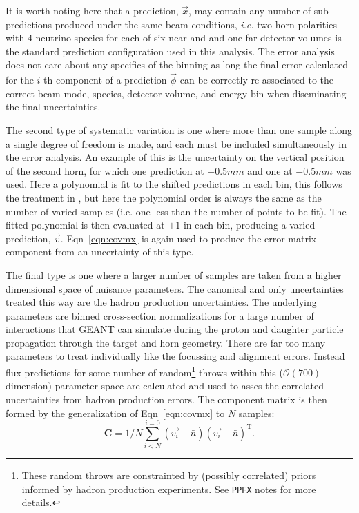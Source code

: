 \documentclass{article}
\begin{document}
It is worth noting here that a prediction, $\vec{x}$, may contain any number of sub-predictions produced under the same beam conditions, \textit{i.e.} two horn polarities with 4 neutrino species for each of six near and and one far detector volumes is the standard prediction configuration used in this analysis. The error analysis does not care about any specifics of the binning as long the final error calculated for the $i$-th component of a prediction $\vec{\phi}$ can be correctly re-associated to the correct beam-mode, species, detector volume, and energy bin when diseminating the final uncertainties.

The second type of systematic variation is one where more than one sample along a single degree of freedom is made, and each must be included simultaneously in the error analysis. An example of this is the uncertainty on the vertical position of the second horn, for which one prediction at $+0.5 mm$ and one at $-0.5 mm$ was used. Here a polynomial is fit to the shifted predictions in each bin, this follows the treatment in \cite{}, but here the polynomial order is always the same as the number of varied samples (i.e. one less than the number of points to be fit). The fitted polynomial is then evaluated at $+1$ in each bin, producing a varied prediction, $\vec{v}$. Eqn~\ref{eqn:covmx} is again used to produce the error matrix component from an uncertainty of this type.

The final type is one where a larger number of samples are taken from a higher dimensional space of nuisance parameters. The canonical and only uncertainties treated this way are the hadron production uncertainties. The underlying parameters are binned cross-section normalizations for a large number of interactions that GEANT can simulate during the proton and daughter particle propagation through the target and horn geometry. There are far too many parameters to treat individually like the focussing and alignment errors. Instead flux predictions for some number of random\footnote{These random throws are constrainted by (possibly correlated) priors informed by hadron production experiments. See \texttt{PPFX} notes\cite{} for more details.} throws within this ($\mathcal{O}\left(700\right)$ dimension) parameter space are calculated and used to asses the correlated uncertainties from hadron production errors. The component matrix is then formed by the generalization of Eqn~\ref{eqn:covmx} to $N$ samples:
\[\mathbf{C} = 1/N\sum^{i=0}_{i<N} \left(\vec{v_{i}}-\bar{n}\right)\left(\vec{v_{i}}-\bar{n}\right)^{\mathrm{T}}\label{eqn:covmxN}.\]
\end{document}
